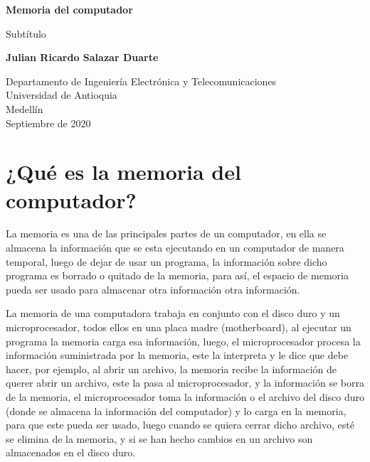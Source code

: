 \documentclass{article}
\begin{document}
\begin{titlepage}
    \begin{center}
        \vspace*{1cm}
            
        \Huge
        \textbf{Memoria del computador}
            
        \vspace{0.5cm}
        \LARGE
        Subtítulo
            
        \vspace{1.5cm}
            
        \textbf{Julian Ricardo Salazar Duarte}
            
        \vfill
            
        \vspace{0.8cm}
            
        \Large
        Departamento de Ingeniería Electrónica y Telecomunicaciones\\
        Universidad de Antioquia\\
        Medellín\\
        Septiembre de 2020
            
    \end{center}
\end{titlepage}

\tableofcontents

\section{¿Qué es la memoria del computador?}
La memoria es una de las principales partes de un computador, en ella se almacena la información que se esta ejecutando en un computador de manera temporal, luego de dejar de usar un programa, la información sobre dicho programa es borrado o quitado de la memoria, para así, el espacio de memoria pueda ser usado para almacenar otra información otra información.
\vspace{3pt}

La memoria de una computadora trabaja en conjunto con el disco duro y un microprocesador, todos ellos en una placa madre (motherboard), al ejecutar un programa la memoria carga esa información, luego, el microprocesador procesa la información suministrada por la memoria, este la interpreta y le dice que debe hacer, por ejemplo, al abrir un archivo, la memoria recibe la información de querer abrir un archivo, este la pasa al microprocesador, y la información se borra de la memoria, el microprocesador toma la información o el archivo del disco duro (donde se almacena la información del computador) y lo carga en la memoria, para que este pueda ser usado, luego cuando se quiera cerrar dicho archivo, esté se elimina de la memoria, y si se han hecho cambios en un archivo son almacenados en el disco duro.
\end{document}
